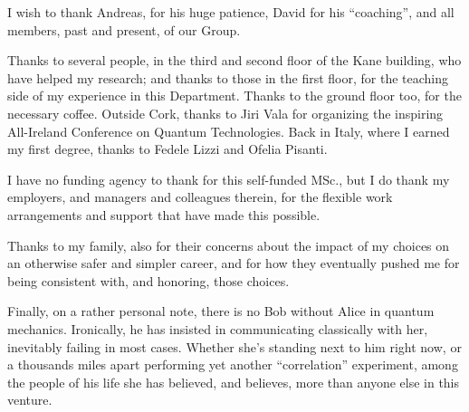 I wish to thank Andreas, for his huge patience, David for
his ``coaching'',
and all members, past and present, of our Group.

Thanks to several people, in the third and second floor of the Kane building,
who have helped my research; and thanks to those in the first floor,
for the teaching side of my experience in this Department.
Thanks to the ground floor too, for the necessary coffee.
Outside Cork, thanks to Jiri Vala
for organizing the inspiring All-Ireland Conference on Quantum Technologies.
Back in Italy, where I earned my first degree, thanks to Fedele Lizzi and Ofelia Pisanti.

I have no funding agency to thank for this self-funded MSc.,
but I do thank my employers, and managers and colleagues therein,
for the flexible work arrangements and support that have made this possible.

Thanks to my family, also for their concerns about the impact of my choices on an otherwise safer and simpler career,
and for how they eventually pushed me for being consistent with, and honoring, those choices.

Finally, on a rather personal note, there is no Bob without Alice in quantum mechanics.
Ironically, he has insisted in communicating classically with her,
inevitably failing in most cases.
Whether she's standing next to him right now,
or a thousands miles apart performing yet another ``correlation'' experiment,
among the people of his life
she has believed, and believes, more than anyone else in this venture.
